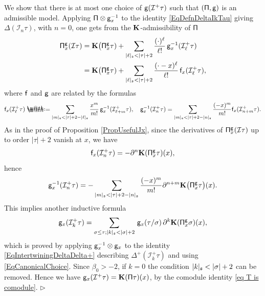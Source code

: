 \documentclass[10pt, reqno]{amsart}
\makeatletter
\numberwithin{subsection}{section}
\numberwithin{subsubsection}{subsection}
\numberwithin{equation}{section} %
\newenvironment{Dem}[1][\unskip]{%
    \begin{list}{\hspace{1.15cm}{\sf \textbf{{\small Proof #1 --}}}}{%
        \setlength{\topsep}{0pt}%
        \setlength{\leftmargin}{0pt}%
        \setlength{\rightmargin}{0pt}%
        \setlength{\listparindent}{0pt}%
        \setlength{\itemindent}{0pt}%
        \setlength{\parsep}{0pt}%
        \addtolength{\leftmargin}{0pt}%
        \addtolength{\rightmargin}{0pt}%
    } \item }{\hfill $\rhd$\end{list}\smallskip}
\theoremstyle{mystyle}
\theoremstyle{mystyle2}
\theoremstyle{mystyle3}
\newcommand{\mcI}{\mathcal{I}}
\newcommand{\bfK}{\mathbf{K}}
\newcommand*{\defeq}{\mathrel{\rlap{%
                     \raisebox{0.3ex}{$\m@th\cdot$}}%
                     \raisebox{-0.3ex}{$\m@th\cdot$}}%
                     =}
\makeatother
\begin{document}
\begin{Dem}
We show that there is at most one choice of ${\sf g}(\mcI^+\tau)$ such that $(\sf \Pi, g)$ is an admissible model. Applying ${\sf\Pi}\otimes{\sf 
g}_x^{-1}$  to the identity \eqref{EqDefnDeltaIkTau} giving $\Delta(\mcI_n\tau)$, with $n=0$, one gets from the $\bf K$-admissibility of ${\sf \Pi}$
\begin{align} \label{eq Pi I tau into K Pi tau + polynomialsAlpha}
\begin{aligned}
{\sf\Pi}_x^{\sf g}(\mcI\tau) &= {\bf K}\big({\sf\Pi}_x^{{\sf g}}\tau) + 
\sum_{|\ell|_{\frak{s}}<|\tau|+2}\frac{(\cdot)^\ell}{\ell!} \, {\sf g}_x^{-1}(\mcI_\ell^+\tau)   \\
&= {\bf K}\big({\sf\Pi}_x^{{\sf g}}\tau) + \sum_{|\ell|_{\frak{s}}<|\tau|+2}\frac{(\cdot-x)^\ell}{\ell!} \, {\sf f}_x(\mcI_\ell^+\tau),
\end{aligned}
\end{align}
where ${\sf f}$ and ${\sf g}$ are related by the formulas
\begin{align*}
{\sf f}_x(\mcI_\ell^+\tau) \defeq  \sum_{ |m|_{\frak{s}}<|\tau|+2-|\ell|_{\frak{s}} }\frac{x^m}{m!}\,{\sf g}_x^{-1}(\mcI_{\ell+m}^+\tau),\quad
{\sf g}_x^{-1}(\mcI_n^+\tau)=\sum_{ |m|_{\frak{s}}<|\tau|+2-|n|_{\frak{s}} } \frac{(-x)^m}{m!}{\sf f}_x(\mcI_{n+m}^+\tau).
\end{align*}
As in the proof of Proposition \ref{PropUsefulJx}, since the derivatives of ${\sf\Pi}_x^{{\sf g}}(\mcI\tau)$ up to order $|\tau|+2$ vanish at $x$, 
we have
\begin{align*}
{\sf f}_x(\mcI_n^+\tau)=-\partial^n{\bf K}({\sf\Pi}_x^{{\sf g}}\tau)(x),
\end{align*}
hence 
\begin{align} \label{EqCanonicalChoice}
{\sf g}_x^{-1}(\mcI_n^+\tau)=-\sum_{|m|_{\frak{s}}<|\tau|+2-|n|_{\frak{s}}}\frac{(-x)^m}{m!}\partial^{n+m}{\bf K}\big({\sf\Pi}_x^{{\sf g}}\tau\big)(x).
\end{align}   
This implies another inductive formula
\begin{align} \label{eq inductive g(I_k^+tau)}
{\sf g}_x(\mcI^+_k\tau) = \sum_{\sigma\le\tau; |k|_{\frak{s}}<|\sigma|+2}\, {\sf g}_x(\tau/\sigma)\, \partial^k\bfK({\sf\Pi}^{{\sf g}}_x\sigma)(x),
\end{align}
which is proved by applying ${\sf g}_x^{-1}\otimes{\sf g}_x$ to the identity \eqref{EqIntertwiningDeltaDelta+} describing $\Delta^+(\mcI^+_k\tau)$ and using \eqref{EqCanonicalChoice}. Since $\beta_0>-2$, if $k=0$ the condition $|k|_{\frak{s}}<|\sigma|+2$ can be removed.
Hence we have ${\sf g}_x(\mcI^+\tau)=\bfK({\sf\Pi}\tau)(x)$, by the comodule identity \eqref{eq T is comodule}.  
\end{Dem}   
\end{document}
